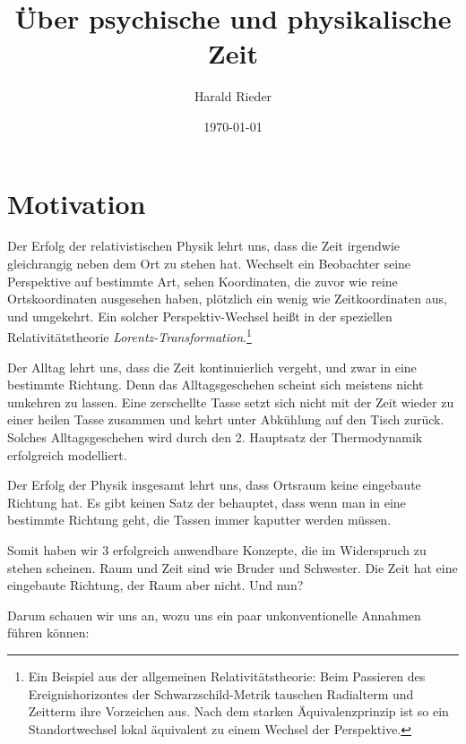 \documentclass[12pt]{article}
\begin{document}
\title{\fontsize{25}{25}\selectfont \textbf{Über psychische und physikalische Zeit}}
\author{Harald Rieder}
\date{\today}
\maketitle



\tableofcontents

\section{Motivation}

Der Erfolg der relativistischen Physik lehrt uns, dass die Zeit irgendwie gleichrangig neben dem Ort zu stehen hat. Wechselt ein Beobachter seine Perspektive auf bestimmte Art, sehen  Koordinaten, die zuvor wie reine Ortskoordinaten ausgesehen haben, plötzlich ein wenig wie Zeitkoordinaten aus, und umgekehrt. Ein solcher Perspektiv-Wechsel heißt in der speziellen Relativitätstheorie \emph{Lorentz-Transformation}.\footnote{Ein Beispiel aus der allgemeinen Relativitätstheorie: Beim Passieren des Ereignishorizontes der Schwarzschild-Metrik tauschen Radialterm und Zeitterm ihre Vorzeichen aus. Nach dem starken Äquivalenzprinzip ist so ein Standortwechsel lokal äquivalent zu einem Wechsel der Perspektive.} 

Der Alltag lehrt uns, dass die Zeit kontinuierlich vergeht, und zwar in eine bestimmte Richtung. Denn das Alltagsgeschehen scheint sich meistens nicht umkehren zu lassen. Eine zerschellte Tasse setzt sich nicht mit der Zeit wieder zu einer heilen Tasse zusammen und kehrt unter Abkühlung auf den Tisch zurück. Solches Alltagsgeschehen wird durch den 2. Hauptsatz der Thermodynamik erfolgreich modelliert.

Der Erfolg der Physik insgesamt lehrt uns, dass Ortsraum keine eingebaute Richtung hat. Es gibt keinen Satz der behauptet, dass wenn man in eine bestimmte Richtung geht, die Tassen immer kaputter werden müssen.

Somit haben wir 3 erfolgreich anwendbare Konzepte, die im Widerspruch zu stehen scheinen. Raum und Zeit sind wie Bruder und Schwester. Die Zeit hat eine eingebaute Richtung, der Raum aber nicht. Und nun?

Darum schauen wir uns an, wozu uns ein paar unkonventionelle Annahmen führen können:
\end{document}
